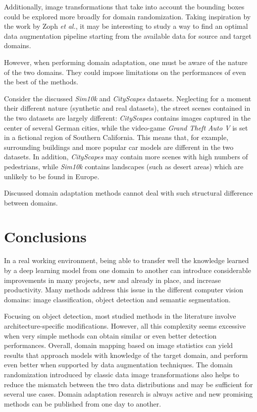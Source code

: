 \documentclass[%
    corpo=12pt,
    twoside,
    stile=classica,   
    tipotesi=magistrale,
    evenboxes,
    english,
	numerazioneromana,
]{toptesi}
\begin{document}
\medskip
Additionally, image transformations that take into account the bounding boxes could be explored more broadly for domain randomization. Taking inspiration by the work by Zoph \textit{et al.}\cite{zoph2019learning}, it may be interesting to study a way to find an optimal data augmentation pipeline starting from the available data for source and target domains.

\bigskip
However, when performing domain adaptation, one must be aware of the nature of the two domains. They could impose limitations on the performances of even the best of the methods.

Consider the discussed \textit{Sim10k} and \textit{CityScapes} datasets. Neglecting for a moment their different nature (synthetic and real datasets), the street scenes contained in the two datasets are largely different: \textit{CityScapes} contains images captured in the center of several German cities, while the video-game \textit{Grand Theft Auto V} is set in a fictional region of Southern California. This means that, for example, surrounding buildings and more popular car models are different in the two datasets. In addition, \textit{CityScapes} may contain more scenes with high numbers of pedestrians, while \textit{Sim10k} contains landscapes (such as desert areas) which are unlikely to be found in Europe. 

Discussed domain adaptation methods cannot deal with such structural difference between domains.

\chapter{Conclusions}
In a real working environment, being able to transfer well the knowledge learned by a deep learning model from one domain to another can introduce considerable improvements in many projects, new and already in place, and increase productivity. Many methods address this issue in the different computer vision domains: image classification, object detection and semantic segmentation.

\bigskip
Focusing on object detection, most studied methods in the literature involve architecture-specific modifications. However, all this complexity seems excessive when very simple methods can obtain similar or even better detection performances. Overall, domain mapping based on image statistics can yield results that approach models with knowledge of the target domain, and perform even better when supported by data augmentation techniques. The domain randomization introduced by classic data image transformations also helps to reduce the mismatch between the two data distributions and may be sufficient for several use cases. Domain adaptation research is always active and new promising methods can be published from one day to another.


\backmatter
\english
\printbibliography[heading=bibintoc]
\end{document}
